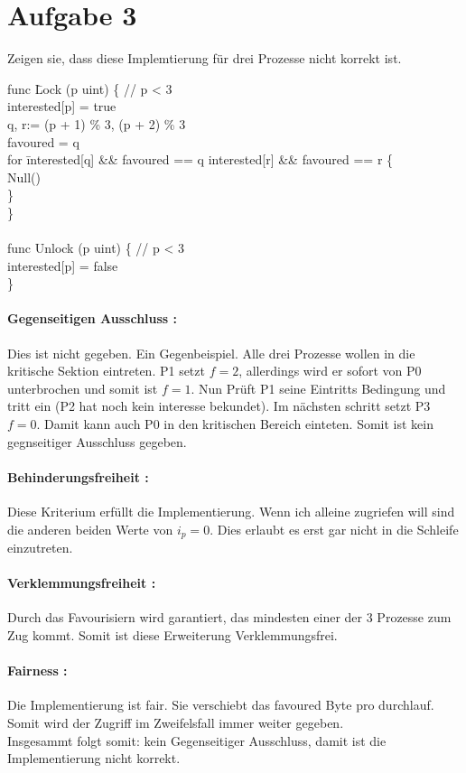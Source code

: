 \section*{Aufgabe 3} Zeigen sie, dass diese Implemtierung für drei Prozesse nicht korrekt ist.

\begin{mylisting}
\begin{tabbing}


func \= Lock (p uint) \{ // p < 3 \\
\>	interested[p] = true \\
\>	q, r:= (p + 1) \% 3, (p + 2) \% 3 \\
\>	favoured = q \\
\>	for \= interested[q] \&\& favoured == q   interested[r] \&\& favoured == r \{ \\
\>	\>	Null() \\
\>	\} \\
\} \\
 \\

func Unlock (p uint) \{ // p < 3 \\
\>	interested[p] = false \\
\} \\

\end{tabbing}
\end{mylisting}


\paragraph{ Gegenseitigen Ausschluss : } Dies ist nicht gegeben. Ein Gegenbeispiel. Alle drei Prozesse wollen in die kritische Sektion eintreten. P1 setzt $ f = 2 $, allerdings wird er sofort von P0 unterbrochen und somit ist $ f = 1 $. Nun Prüft P1 seine Eintritts Bedingung und tritt ein (P2 hat noch kein interesse bekundet). Im nächsten schritt setzt P3 $ f = 0$. Damit kann auch P0 in den kritischen Bereich einteten. Somit ist kein gegnseitiger Ausschluss gegeben.


\paragraph{ Behinderungsfreiheit : } Diese Kriterium erfüllt die Implementierung. Wenn ich alleine zugriefen will sind die anderen beiden Werte von $ i_{p} = 0$. Dies erlaubt es erst gar nicht in die Schleife einzutreten.


\paragraph{ Verklemmungsfreiheit : } Durch das Favourisiern wird garantiert, das mindesten einer der 3 Prozesse zum Zug kommt. Somit ist diese Erweiterung Verklemmungsfrei.

\paragraph{ Fairness : } Die Implementierung ist fair. Sie verschiebt das favoured Byte pro durchlauf. Somit wird der Zugriff im Zweifelsfall immer weiter gegeben.\\ 
Insgesammt folgt somit: kein Gegenseitiger Ausschluss, damit ist die Implementierung nicht korrekt.